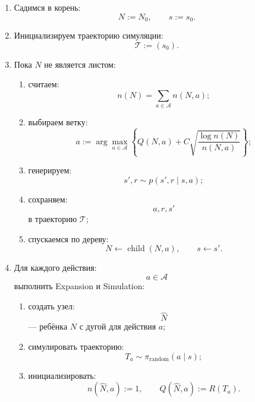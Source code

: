 \documentclass[12pt,a4paper]{article}
\begin{document}
\begin{enumerate}
    \item Садимся в корень:
    \[
    N:=N_0,
    \qquad
    s:=s_0.
    \]

    \item Инициализируем траекторию симуляции:
    \[
    \mathcal T:=(s_0).
    \]

    \item Пока $N$ не является листом:

    \begin{enumerate}
        \item считаем:
        \[
        n(N)=\sum_{a\in\mathcal A}n(N,a);
        \]

        \item выбираем ветку:
        \[
        a
        :=
        \arg\max_{a\in\mathcal A}
        \left\{
        Q(N,a)
        +
        C
        \sqrt{
        \frac{\log n(N)}{n(N,a)}
        }
        \right\};
        \]

        \item генерируем:
        \[
        s',r
        \sim
        p(s',r\mid s,a);
        \]

        \item сохраняем:
        \[
        a,r,s'
        \]
        в траекторию $\mathcal T$;

        \item спускаемся по дереву:
        \[
        N\leftarrow \operatorname{child}(N,a),
        \qquad
        s\leftarrow s'.
        \]
    \end{enumerate}

    \item Для каждого действия:
    \[
    a\in\mathcal A
    \]
    выполнить Expansion и Simulation:

    \begin{enumerate}
        \item создать узел:
        \[
        \widehat N
        \]
        --- ребёнка $N$ с дугой для действия $a$;

        \item симулировать траекторию:
        \[
        T_a
        \sim
        \pi_{\mathrm{random}}(a\mid s);
        \]

        \item инициализировать:
        \[
        n(\widehat N,a):=1,
        \qquad
        Q(\widehat N,a):=R(T_a).
        \]
    \end{enumerate}


\end{enumerate}
\end{document}
